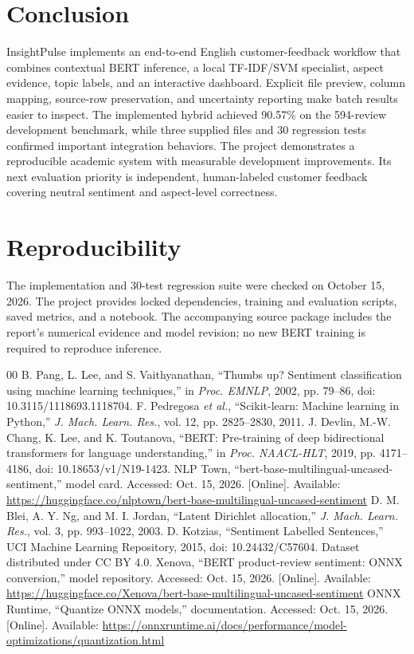 \documentclass[conference,a4paper]{IEEEtran}
\begin{document}
\section{Conclusion}
InsightPulse implements an end-to-end English customer-feedback workflow that combines contextual BERT inference, a local TF-IDF/SVM specialist, aspect evidence, topic labels, and an interactive dashboard. Explicit file preview, column mapping, source-row preservation, and uncertainty reporting make batch results easier to inspect. The implemented hybrid achieved 90.57\% on the 594-review development benchmark, while three supplied files and 30 regression tests confirmed important integration behaviors. The project demonstrates a reproducible academic system with measurable development improvements. Its next evaluation priority is independent, human-labeled customer feedback covering neutral sentiment and aspect-level correctness.

\section*{Reproducibility}
The implementation and 30-test regression suite were checked on October 15, 2026. The project provides locked dependencies, training and evaluation scripts, saved metrics, and a notebook. The accompanying source package includes the report's numerical evidence and model revision; no new BERT training is required to reproduce inference.

\begin{thebibliography}{00}
 B. Pang, L. Lee, and S. Vaithyanathan, ``Thumbs up? Sentiment classification using machine learning techniques,'' in \emph{Proc. EMNLP}, 2002, pp. 79--86, doi: 10.3115/1118693.1118704.
 F. Pedregosa \emph{et al.}, ``Scikit-learn: Machine learning in Python,'' \emph{J. Mach. Learn. Res.}, vol. 12, pp. 2825--2830, 2011.
 J. Devlin, M.-W. Chang, K. Lee, and K. Toutanova, ``BERT: Pre-training of deep bidirectional transformers for language understanding,'' in \emph{Proc. NAACL-HLT}, 2019, pp. 4171--4186, doi: 10.18653/v1/N19-1423.
 NLP Town, ``bert-base-multilingual-uncased-sentiment,'' model card. Accessed: Oct. 15, 2026. [Online]. Available: \url{https://huggingface.co/nlptown/bert-base-multilingual-uncased-sentiment}
 D. M. Blei, A. Y. Ng, and M. I. Jordan, ``Latent Dirichlet allocation,'' \emph{J. Mach. Learn. Res.}, vol. 3, pp. 993--1022, 2003.
 D. Kotzias, ``Sentiment Labelled Sentences,'' UCI Machine Learning Repository, 2015, doi: 10.24432/C57604. Dataset distributed under CC BY 4.0.
 Xenova, ``BERT product-review sentiment: ONNX conversion,'' model repository. Accessed: Oct. 15, 2026. [Online]. Available: \url{https://huggingface.co/Xenova/bert-base-multilingual-uncased-sentiment}
 ONNX Runtime, ``Quantize ONNX models,'' documentation. Accessed: Oct. 15, 2026. [Online]. Available: \url{https://onnxruntime.ai/docs/performance/model-optimizations/quantization.html}
\end{thebibliography}
\end{document}
